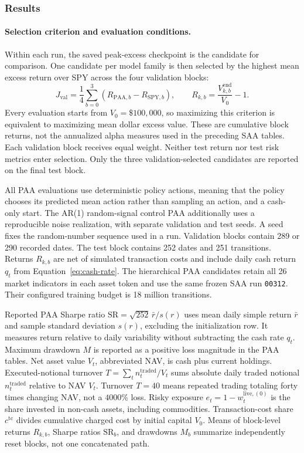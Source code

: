 \subsubsection{Results}
\label{sec:paa-results-presentation}

\paragraph{Selection criterion and evaluation conditions.}
Within each run, the saved peak-excess checkpoint is the candidate for comparison. One candidate per model family is then selected by the highest mean excess return over SPY across the four validation blocks:
\begin{equation}
J_{\mathrm{val}} = \frac{1}{4}\sum_{b=0}^{3}\left(R_{\mathrm{PAA},b}-R_{\mathrm{SPY},b}\right),
\qquad R_{k,b}=\frac{V_{k,b}^{\mathrm{end}}}{V_0}-1.
\label{eq:paa-selection}
\end{equation}
Every evaluation starts from \(V_0=\$100{,}000\), so maximizing this criterion is equivalent to maximizing mean dollar excess value. These are cumulative block returns, not the annualized alpha measures used in the preceding SAA tables. Each validation block receives equal weight. Neither test return nor test risk metrics enter selection. Only the three validation-selected candidates are reported on the final test block.

All PAA evaluations use deterministic policy actions, meaning that the policy chooses its predicted mean action rather than sampling an action, and a cash-only start. The AR(1) random-signal control PAA additionally uses a reproducible noise realization, with separate validation and test seeds. A seed fixes the random-number sequence used in a run. Validation blocks contain 289 or 290 recorded dates. The test block contains 252 dates and 251 transitions. Returns \(R_{k,b}\) are net of simulated transaction costs and include daily cash return \(q_t\) from Equation~\eqref{eq:cash-rate}. The hierarchical PAA candidates retain all 26 market indicators in each asset token and use the same frozen SAA run \texttt{00312}. Their configured training budget is 18 million transitions.

Reported PAA Sharpe ratio \(\mathrm{SR}=\sqrt{252}\,\bar r/s(r)\) uses mean daily simple return \(\bar r\) and sample standard deviation \(s(r)\), excluding the initialization row. It measures return relative to daily variability without subtracting the cash rate \(q_t\). Maximum drawdown \(M\) is reported as a positive loss magnitude in the PAA tables. Net asset value \(V_t\), abbreviated NAV, is cash plus current holdings. Executed-notional turnover \(T=\sum_t n_t^{\mathrm{traded}}/V_t\) sums absolute daily traded notional \(n_t^{\mathrm{traded}}\) relative to NAV \(V_t\). Turnover \(T=40\) means repeated trading totaling forty times changing NAV, not a \(4000\%\) loss. Risky exposure \(e_t=1-w_t^{\mathrm{live},(0)}\) is the share invested in non-cash assets, including commodities. Transaction-cost share \(c^{\mathrm{tc}}\) divides cumulative charged cost by initial capital \(V_0\). Means of block-level returns \(R_{k,b}\), Sharpe ratios \(\mathrm{SR}_b\), and drawdowns \(M_b\) summarize independently reset blocks, not one concatenated path.

